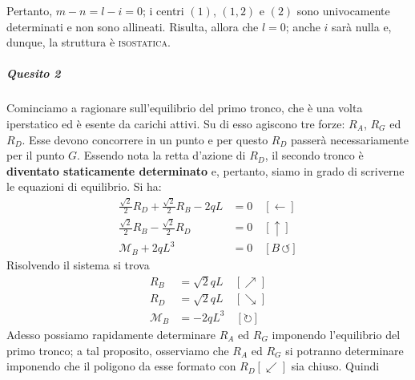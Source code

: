 Pertanto, $m - n = l - i = 0$; i centri $(1)$, $(1, 2)$ e $(2)$ sono univocamente determinati e non sono allineati. Risulta, allora che $l=0$; anche $i$ sarà nulla e, dunque, la struttura è \textsc{isostatica}.
\subparagraph{Quesito 2}
Cominciamo a ragionare sull'equilibrio del primo tronco, che è una volta iperstatico ed è esente da carichi attivi. Su di esso agiscono tre forze: $R_{A}$, $R_{G}$ ed $R_{D}$. Esse devono concorrere in un punto e per questo $R_D$ passerà necessariamente per il punto $G$. Essendo nota la retta d'azione di $R_{D}$, il secondo tronco è \textbf{diventato staticamente determinato} e, pertanto, siamo in grado di scriverne le equazioni di equilibrio. Si ha:
\begin{align*}
\frac{\sqrt{2}}{2} R_{D} + \frac{\sqrt{2}}{2} R_{B} - 2qL &= 0 \quad [\leftarrow] \\ 
\frac{\sqrt{2}}{2} R_{B} - \frac{\sqrt{2}}{2} R_{D}          &= 0 \quad [\uparrow] \\
\mathcal{M}_{B} + 2qL^{3}                                          &= 0 \quad [B\, \circlearrowleft] 
\end{align*}
Risolvendo il sistema si trova
\begin{subequations}
\begin{align}
R_{B}                &= \sqrt{2}qL  \quad [\nearrow] \label{equazione12-2-1a} \tag{12.2.1a} \\
R_{D}                &= \sqrt{2}qL  \quad [\searrow] \label{equazione12-2-1b} \tag{12.2.1b} \\ 
\mathcal{M}_{B} &= -2qL^{3} \quad [\circlearrowright] \label{equazione12-2-1c} \tag{12.2.1c}
\end{align}
\end{subequations}
Adesso possiamo rapidamente determinare $R_{A}$ ed $R_{G}$ imponendo l'equilibrio del primo tronco; a tal proposito, osserviamo che $R_{A}$ ed $R_{G}$ si potranno determinare imponendo che il poligono da esse formato con $R_{D} [\swarrow]$ sia chiuso. Quindi 

